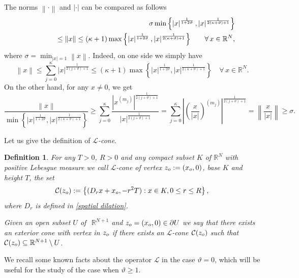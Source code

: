 \documentclass{amsart}
\newtheorem{defn}[thm]{Definition}
\numberwithin{equation}{section}
\def \R {{\mathbb {R}}}
\def \Lc{{\mathcal{L}}}
\def \r{{\mathbb{R}}}
\begin{document}
{{\begin{equation}
\end{equation}
The norms $\left\|\cdot\right\|$ and $\left|\cdot\right|$ can be compared as follows 
\begin{eqnarray}\label{confrhomnonhom}
&& \sigma\min{\left\{\left|x\right|^\frac{1}{1+2\vartheta}, \left|x\right|^{\frac{1}{2(\kappa+\vartheta)+1}}\right\}}\notag\\
&& \qquad \quad \leq\left\|x\right\|\leq (\kappa+1)\max{\left\{\left|x\right|^\frac{1}{1+2\vartheta}, \left|x\right|^{\frac{1}{2(\kappa+\vartheta)+1}}\right\}}\qquad \forall\,x\in\r^N,
\end{eqnarray}
where $\sigma=\min_{|x|=1}{\left\|x\right\|}$.
Indeed, on one side we simply have
\[
\left\|x\right\|\leq \sum_{j=0}^\kappa\left|x\right|^{\frac{1}{2(j+\vartheta)+1}}\leq (\kappa+1)\max{\left\{\left|x\right|^\frac{1}{1+2\vartheta}, \left|x\right|^{\frac{1}{2(\kappa+\vartheta)+1}}\right\}}\quad \forall\,x\in\r^N.
\]
On the other hand, for any $x\neq 0$, we get
\[
\frac{\left\|x\right\|}{\min{\left\{\left|x\right|^\frac{1}{1+2\vartheta}, \left|x\right|^{\frac{1}{2(\kappa+\vartheta)+1}}\right\}}}\geq\sum_{j=0}^\kappa{\frac{\left|x^{(m_j)}\right|^{\frac{1}{2(j+\vartheta)+1}}}{\left|x\right|^{\frac{1}{2(j+\vartheta)+1}}}}=\sum_{j=0}^\kappa{\left|\left(\frac{x}{\left|x\right|}\right)^{(m_j)}\right|^{\frac{1}{2(j+\vartheta)+1}}}=\left\|\frac{x}{\left|x\right|}\right\|\geq\sigma.
\]
}

 Let us give the definition of {\it $\Lc$-cone}.
\begin{defn}
	\label{l-cone}
	For any $T>0$, $R>0$ and any compact subset $K$ of $\r^N$ with positive Lebesgue measure we call $\Lc$\textup{-cone} of vertex $z_{\rm o}:=(x_{\rm o},0)$, base $K$ and height $T$, the set
$$
\mathcal{C}(z_{\rm o}) :=\left\{(D_rx+x_{\rm o},-r^2T): x \in K, 0 \leq r \leq R\right\},
$$
where $D_r$ is defined in \eqref{spatial dilation}.

Given an open subset $U$ of~$\ \R^{N+1}$ and ${z_{\rm o}=(x_{\rm o},0)} \in \partial U$ we say that there exists an \textup{exterior cone} with vertex in $z_{\rm o}$ if there exists an $\Lc$-cone $\mathcal{C}(z_{\rm o})$ such that $\mathcal{C}(z_{\rm o}) \subseteq \r^{N+1} \setminus U$.
\end{defn}

We recall some known facts about the operator $\Lc$ in the case $\vartheta = 0$, which will be useful for the study of the case when $\vartheta \ge 1$. 

\medskip

}
\end{document}
